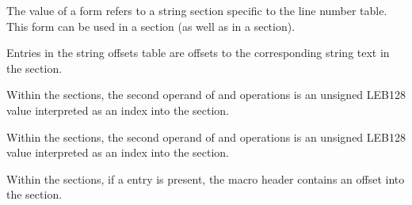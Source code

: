 \begin{description}
\bb
{}
The value of a \DWFORMlinestrp{} form refers to a string section specific
to the line number table. This form can be used in a \dotdebuglinedwo{} section
(as well as in a \dotdebuginfodwo{} section).

Entries in the string offsets table are offsets to the corresponding string text
in the \dotdebugstrdwo{} section.

Within the \dotdebugmacrodwo{} sections, the second operand of \DWMACROdefinestrx{}
and \DWMACROundefstrx{} operations is an unsigned LEB128 value interpreted as an
index into the \dotdebugstroffsetsdwo{} section.

Within the \dotdebugmacrodwo{} sections, the second operand of \DWMACROdefinestrp{}
and \DWMACROundefstrp{} operations is an unsigned LEB128 value interpreted as an
index into the \dotdebugstrdwo{} section.

Within the \dotdebugmacrodwo{} sections, if a \DWMACROstartfile{} entry is present,
the macro header contains an offset into the \dotdebuglinedwo{} section.

\eb

\end{description}